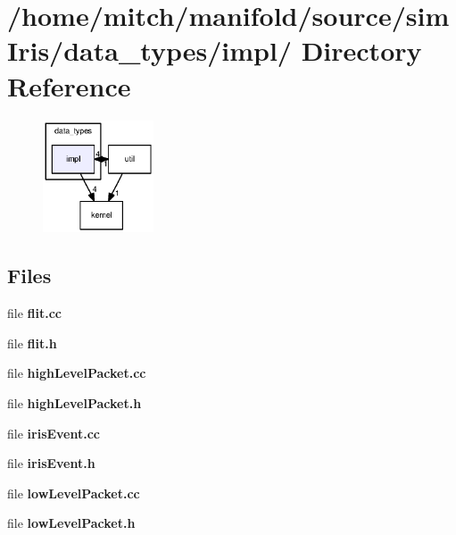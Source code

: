 \section{/home/mitch/manifold/source/simIris/data\_\-types/impl/ Directory Reference}
\label{dir_17bb1aac8738f08989bff506df06071f}


\nopagebreak
\begin{figure}[H]
\begin{center}
\leavevmode
\includegraphics[width=93pt]{dir_17bb1aac8738f08989bff506df06071f_dep}
\end{center}
\end{figure}
\subsection*{Files}
\begin{CompactItemize}
\item 
file {\bf flit.cc}
\item 
file {\bf flit.h}
\item 
file {\bf highLevelPacket.cc}
\item 
file {\bf highLevelPacket.h}
\item 
file {\bf irisEvent.cc}
\item 
file {\bf irisEvent.h}
\item 
file {\bf lowLevelPacket.cc}
\item 
file {\bf lowLevelPacket.h}
\end{CompactItemize}
